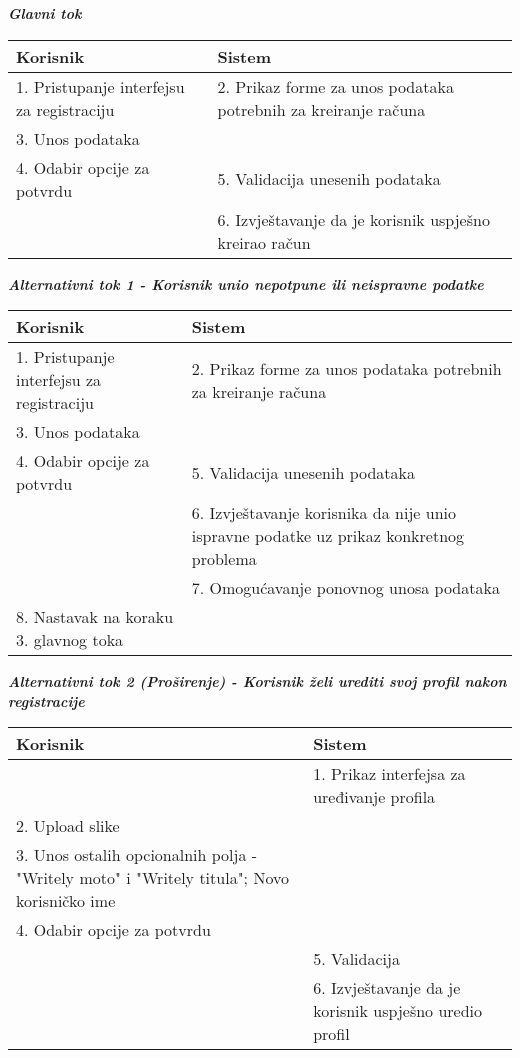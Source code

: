 \documentclass[12pt, a4paper]{report}
\begin{document}
\begin{flushleft}
\textbf{\textit{Glavni tok}}
\begin{tabular}{|m{7cm}|m{7cm}|}
\hline
\textbf{Korisnik} & \textbf{Sistem} \\
\hline
1. Pristupanje interfejsu za registraciju & 2. Prikaz forme za unos podataka potrebnih za kreiranje računa \\
\hline
3. Unos podataka &  \\
\hline
4. Odabir opcije za potvrdu & 5. Validacija unesenih podataka \\
\hline
& 6. Izvještavanje da je korisnik uspješno kreirao račun \\
\hline
\end{tabular} \newline \newline

\textbf{\textit{Alternativni tok 1 - Korisnik unio nepotpune ili neispravne podatke}}

\begin{tabular}{|m{7cm}|m{7cm}|}
\hline
\textbf{Korisnik} & \textbf{Sistem} \\
\hline
1. Pristupanje interfejsu za registraciju & 2. Prikaz forme za unos podataka potrebnih za kreiranje računa \\
\hline
3. Unos podataka &  \\
\hline
4. Odabir opcije za potvrdu & 5. Validacija unesenih podataka \\
\hline
& 6. Izvještavanje  korisnika da nije unio ispravne podatke uz prikaz konkretnog problema \\
\hline
& 7. Omogućavanje ponovnog unosa podataka \\
\hline
8. Nastavak na koraku 3. glavnog toka & \\
\hline
\end{tabular} \newline \newline

\textbf{\textit{Alternativni tok 2 (Proširenje) - Korisnik želi urediti svoj profil nakon registracije}}
\begin{tabular}{|m{7cm}|m{7cm}|}
\hline
\textbf{Korisnik} & \textbf{Sistem} \\
\hline
 & 1. Prikaz interfejsa za uređivanje profila \\
\hline
2. Upload slike &  \\
\hline
3. Unos ostalih opcionalnih polja - "Writely moto" i "Writely titula"; Novo korisničko ime & \\
\hline
4. Odabir opcije za potvrdu & \\
\hline
& 5. Validacija \\
\hline
& 6. Izvještavanje da je korisnik uspješno uredio profil \\
\hline
\end{tabular}
\newpage


\end{flushleft}
\end{document}

